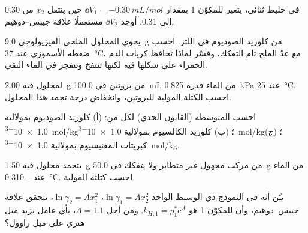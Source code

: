 \begin{exercise}[$\star\star$]\label{exo:b2:chemical-potential:5}
في خليط ثنائي، يتغير  للمكوّن 1 بمقدار
$\dd\bar V_1 = \qty{-0.30}{mL/mol}$ حين ينتقل $x_2$ من 0.30 إلى 0.31. أوجد
$\dd\bar V_2$ مستعملًا علاقة جيبس--دوهيم.
\end{exercise}

\begin{exercise}[$\star\star$]\label{exo:b2:chemical-potential:6}
يحوي المحلول الملحي الفيزيولوجي \qty{9.0}{g} من كلوريد الصوديوم في اللتر.
احسب ضغطه الأسموزي عند \qty{37}{\celsius}، مع عدّ الملح تام
التفكك، وفسّر لماذا تحافظ كريات الدم الحمراء على شكلها فيه لكنها تنتفخ
وتنفجر في الماء النقي.
\end{exercise}

\begin{exercise}[$\star\star$]\label{exo:b2:chemical-potential:7}
لمحلول فيه \qty{2.00}{g} من بروتين في \qty{100.0}{mL} من الماء  قدره \qty{0.825}{kPa} عند \qty{25}{\celsius}. احسب الكتلة المولية
للبروتين، وانخفاض درجة تجمد هذا المحلول.
\end{exercise}

\begin{exercise}[$\star\star$]\label{exo:b2:chemical-potential:8}
احسب   المتوسطة (القانون الحدي)
لكل من: (أ) كلوريد الصوديوم بمولالية \qty{1.0e-3}{mol/kg}؛ (ب) كلوريد
الكالسيوم بمولالية \qty{1.0e-3}{mol/kg}؛ (ج) كبريتات المغنيسيوم بمولالية \qty{1.0e-3}{mol/kg}.
\end{exercise}

\begin{exercise}[$\star\star$]\label{exo:b2:chemical-potential:9}
يتجمد محلول فيه \qty{1.50}{g} من مركب مجهول غير متطاير ولا يتفكك
في \qty{50.0}{g} من الماء عند \qty{-0.310}{\celsius}. احسب
كتلته المولية.
\end{exercise}

\begin{exercise}[$\star\star\star$]\label{exo:b2:chemical-potential:10}
بيّن أنه في النموذج ذي الوسيط الواحد $\ln\gamma_1 = Ax_2^2$، $\ln\gamma_2 =
Ax_1^2$، تتحقق علاقة جيبس--دوهيم، وأن  للمكوّن 1 هو
$k_{H,1} = p_1^*\mathrm e^A$. ومن أجل $A = 1.1$، بأي عامل يزيد ميل هنري
على ميل راوول؟
\end{exercise}

